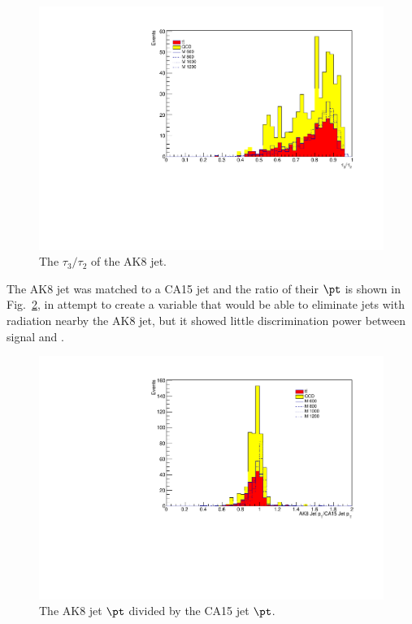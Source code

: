 \begin{figure}[thb!]
\begin{center}
\includegraphics[scale=0.5]{Figures/extraplSRtau32.pdf}
\end{center}
\caption{The $\tau_{3}/\tau_{2}$ of the AK8 jet.}
\label{fig:AK8tau32}
\end{figure} 

The AK8 jet was matched to a CA15 jet and the ratio of their $\pt$ is shown in Fig.~\ref{fig:AK8CA15}, in attempt to create a variable that would be able to eliminate jets with radiation nearby the AK8 jet, but it showed little discrimination power between signal and \ttbar.

\begin{figure}[thb!]
\begin{center}
\includegraphics[scale=0.5]{Figures/extraplSRakca.pdf}
\end{center}
\caption{The AK8 jet $\pt$ divided by the CA15 jet $\pt$.}
\label{fig:AK8CA15}
\end{figure} 

